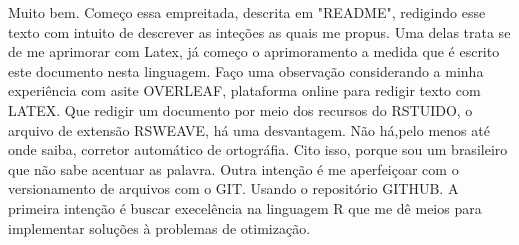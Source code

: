 \documentclass{article}
\begin{document}


Muito bem. Começo essa empreitada, descrita em "README", redigindo esse texto com intuito de descrever as inteções as quais me propus. Uma delas trata se de me aprimorar com Latex, já começo o aprimoramento a medida que é escrito este documento nesta linguagem. Faço uma observação considerando a minha experiência com asite OVERLEAF, plataforma online para redigir texto com LATEX. Que redigir um documento por meio dos recursos do RSTUIDO, o arquivo de extensão RSWEAVE, há uma desvantagem. Não há,pelo menos até onde saiba, corretor automático de ortográfia. Cito isso, porque sou um brasileiro que não sabe acentuar as palavra.
Outra intenção é me aperfeiçoar com o versionamento de arquivos com o GIT. Usando o repositório GITHUB. 
A primeira intenção é buscar execelência na linguagem R que me dê meios para implementar soluções à problemas de otimização.
\end{document}
